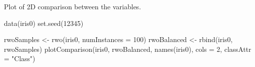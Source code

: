 %
\begin{Value}
Plot of 2D comparison between the variables.
\end{Value}
%
\begin{Examples}
\begin{ExampleCode}
data(iris0)
set.seed(12345)

rwoSamples <- rwo(iris0, numInstances = 100)
rwoBalanced <- rbind(iris0, rwoSamples)
plotComparison(iris0, rwoBalanced, names(iris0), cols = 2, classAttr = "Class")

\end{ExampleCode}
\end{Examples}
